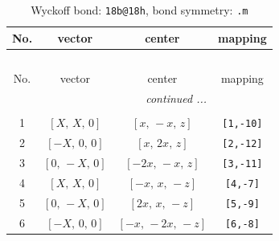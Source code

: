 \documentclass[fleqn,8pt]{jsarticle}
\begin{document}
\begin{longtable}{cccc}
\caption{Wyckoff bond: {\tt 18b@18h}, bond symmetry: {\tt .m}}
 \\
 \hline \hline
No. & vector & center & mapping \\ \hline \endfirsthead

\multicolumn{3}{l}{\tablename\ \thetable{}} \\
 \hline \hline
No. & vector & center & mapping \\ \hline \endhead

 \hline \hline
\multicolumn{3}{r}{\footnotesize\it continued ...} \\ \endfoot

 \hline \hline
\multicolumn{3}{r}{} \\ \endlastfoot

1 & $\left[ X,\, X,\, 0 \right]$ & $\left[ x,\, - x,\, z \right]$ & {\tt [1,-10]} \\ \hline
2 & $\left[ - X,\, 0,\, 0 \right]$ & $\left[ x,\, 2 x,\, z \right]$ & {\tt [2,-12]} \\ \hline
3 & $\left[ 0,\, - X,\, 0 \right]$ & $\left[ - 2 x,\, - x,\, z \right]$ & {\tt [3,-11]} \\ \hline
4 & $\left[ X,\, X,\, 0 \right]$ & $\left[ - x,\, x,\, - z \right]$ & {\tt [4,-7]} \\ \hline
5 & $\left[ 0,\, - X,\, 0 \right]$ & $\left[ 2 x,\, x,\, - z \right]$ & {\tt [5,-9]} \\ \hline
6 & $\left[ - X,\, 0,\, 0 \right]$ & $\left[ - x,\, - 2 x,\, - z \right]$ & {\tt [6,-8]} \\
\end{longtable}
\renewcommand{\arraystretch}{1.2}
\end{document}
